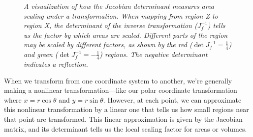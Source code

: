 \begin{figure}[H]
\centering
{}
\caption{\textit{A visualization of how the Jacobian determinant measures area scaling under a transformation. When mapping from region Z to region X, the determinant of the inverse transformation ($J_f^{-1}$) tells us the factor by which areas are scaled. Different parts of the region may be scaled by different factors, as shown by the red ($\det J_f^{-1} = \frac{1}{4}$) and green ($\det J_f^{-1} = -\frac{1}{4}$) regions. The negative determinant indicates a reflection.}}
\end{figure}

\noindent When we transform from one coordinate system to another, we're generally making a nonlinear transformation—like our polar coordinate transformation where $x = r\cos\theta$ and $y = r\sin\theta$. However, at each point, we can approximate this nonlinear transformation by a linear one that tells us how small regions near that point are transformed. This linear approximation is given by the Jacobian matrix, and its determinant tells us the local scaling factor for areas or volumes. \\

